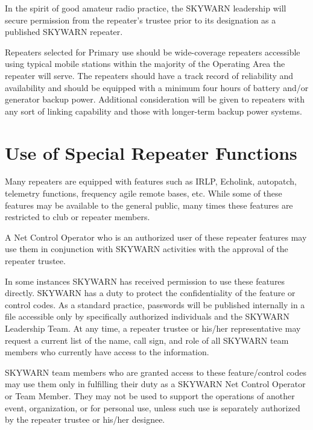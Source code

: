 \documentclass[pdflatex,letterpaper,twoside,12pt]{book}
\begin{document}
In the spirit of good amateur radio practice, the SKYWARN leadership will secure permission from the repeater's trustee prior to its designation as a published SKYWARN repeater. 


Repeaters selected for Primary use should be wide-coverage repeaters accessible using typical mobile stations within the majority of the Operating Area the repeater will serve.  The repeaters should have a track record of reliability and availability and should be equipped with a minimum four hours of battery and/or generator backup power.  Additional consideration will be given to repeaters with any sort of linking capability and those with longer-term backup power systems.


\section{Use of Special Repeater Functions}

Many repeaters are equipped with features such as IRLP, Echolink, autopatch, telemetry functions, frequency agile remote bases, etc.  While some of these features may be available to the general public, many times these features are restricted to club or repeater members. 

A Net Control Operator who is an authorized user of these repeater features may use them in conjunction with SKYWARN activities with the approval of the repeater trustee. 

In some instances SKYWARN has received permission to use these features directly.  SKYWARN has a duty to protect the confidentiality of the feature or control codes.  As a standard practice, passwords will be published internally in a file accessible only by specifically authorized individuals and the SKYWARN Leadership Team.  At any time, a repeater trustee or his/her representative may request a current list of the name, call sign, and role of all SKYWARN team members who currently have access to the information.

SKYWARN team members who are granted access to these feature/control codes may use them only in fulfilling their duty as a SKYWARN Net Control Operator or Team Member.  They may not be used to support the operations of another event, organization, or for personal use, unless such use is separately authorized by the repeater trustee or his/her designee.
\end{document}
